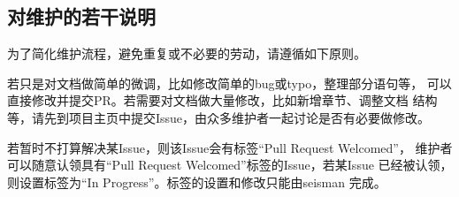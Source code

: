 \subsection{对维护的若干说明}
为了简化维护流程，避免重复或不必要的劳动，请遵循如下原则。

若只是对文档做简单的微调，比如修改简单的bug或typo，整理部分语句等，
可以直接修改并提交PR。若需要对文档做大量修改，比如新增章节、调整文档
结构等，请先到项目主页中提交Issue，由众多维护者一起讨论是否有必要做修改。

若暂时不打算解决某Issue，则该Issue会有标签``Pull Request Welcomed''，
维护者可以随意认领具有``Pull Request Welcomed''标签的Issue，若某Issue
已经被认领，则设置标签为``In Progress''。标签的设置和修改只能由seisman
完成。
